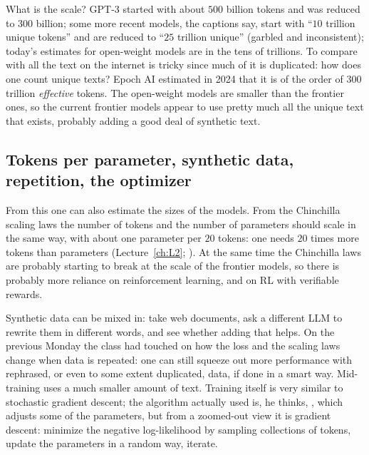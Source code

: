What is the scale? GPT-3 started with about $500$ billion tokens and was reduced to $300$ billion; some more recent models, the captions say, start with ``$10$ trillion unique tokens'' and are reduced to ``$25$ trillion unique'' (garbled and inconsistent\flag); today's estimates for open-weight models are in the tens of trillions. To compare with all the text on the internet is tricky since much of it is duplicated: how does one count unique texts? Epoch AI estimated in 2024 that it is of the order of $300$ trillion \emph{effective} tokens. The open-weight models are smaller than the frontier ones, so the current frontier models appear to use pretty much all the unique text that exists, probably adding a good deal of synthetic text.

\subsection{Tokens per parameter, synthetic data, repetition, the optimizer}\label{sec:L6-chinchilla}
From this one can also estimate the sizes of the models. From the Chinchilla scaling laws the number of tokens and the number of parameters should scale in the same way, with about one parameter per $20$ tokens: one needs $20$ times more tokens than parameters (Lecture~\ref{ch:L2}; \citealp{hoffmann2022}). At the same time the Chinchilla laws are probably starting to break at the scale of the frontier models, so there is probably more reliance on reinforcement learning, and on RL with verifiable rewards.

Synthetic data can be mixed in: take web documents, ask a different LLM to rewrite them in different words, and see whether adding that helps. On the previous Monday the class had touched on how the loss and the scaling laws change when data is repeated: one can still squeeze out more performance with rephrased, or even to some extent duplicated, data, if done in a smart way. Mid-training uses a much smaller amount of text. Training itself is very similar to stochastic gradient descent; the algorithm actually used is, he thinks, , which adjusts some of the parameters, but from a zoomed-out view it is gradient descent: minimize the negative log-likelihood by sampling collections of tokens, update the parameters in a random way, iterate.


